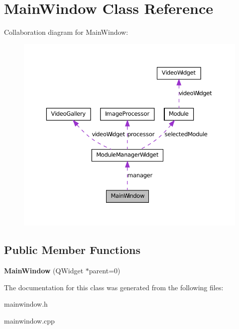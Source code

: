 \hypertarget{class_main_window}{
\section{MainWindow Class Reference}
\label{d9/dc6/class_main_window}
}


Collaboration diagram for MainWindow:
\nopagebreak
\begin{figure}[H]
\begin{center}
\leavevmode
\includegraphics[width=369pt]{d0/db8/class_main_window__coll__graph}
\end{center}
\end{figure}
\subsection*{Public Member Functions}
\begin{DoxyCompactItemize}
\item 
\hypertarget{class_main_window_a8b244be8b7b7db1b08de2a2acb9409db}{
{\bfseries MainWindow} (QWidget $\ast$parent=0)}
\label{d9/dc6/class_main_window_a8b244be8b7b7db1b08de2a2acb9409db}

\end{DoxyCompactItemize}


The documentation for this class was generated from the following files:\begin{DoxyCompactItemize}
\item 
mainwindow.h\item 
mainwindow.cpp\end{DoxyCompactItemize}
